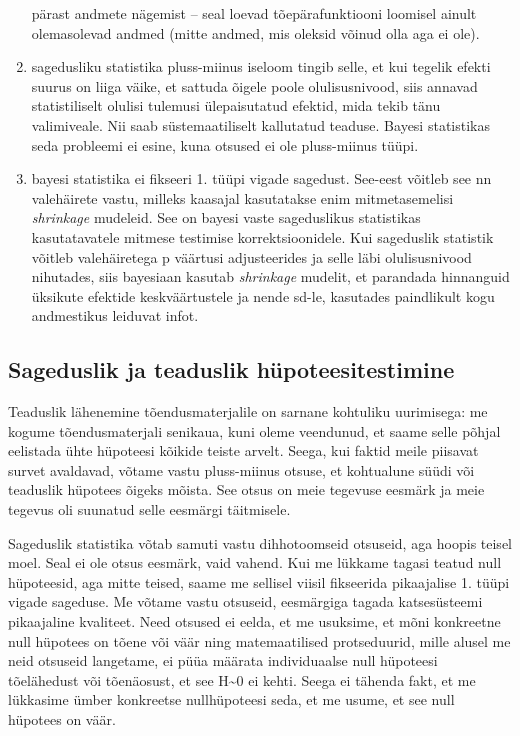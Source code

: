 \documentclass[]{book}
\begin{document}
\begin{enumerate}
  pärast andmete nägemist -- seal loevad tõepärafunktiooni loomisel
  ainult olemasolevad andmed (mitte andmed, mis oleksid võinud olla aga
  ei ole).
\item
  sagedusliku statistika pluss-miinus iseloom tingib selle, et kui
  tegelik efekti suurus on liiga väike, et sattuda õigele poole
  olulisusnivood, siis annavad statistiliselt olulisi tulemusi
  ülepaisutatud efektid, mida tekib tänu valimiveale. Nii saab
  süstemaatiliselt kallutatud teaduse. Bayesi statistikas seda probleemi
  ei esine, kuna otsused ei ole pluss-miinus tüüpi.
\item
  bayesi statistika ei fikseeri 1. tüüpi vigade sagedust. See-eest
  võitleb see nn valehäirete vastu, milleks kaasajal kasutatakse enim
  mitmetasemelisi \emph{shrinkage} mudeleid. See on bayesi vaste
  sageduslikus statistikas kasutatavatele mitmese testimise
  korrektsioonidele. Kui sageduslik statistik võitleb valehäiretega p
  väärtusi adjusteerides ja selle läbi olulisusnivood nihutades, siis
  bayesiaan kasutab \emph{shrinkage} mudelit, et parandada hinnanguid
  üksikute efektide keskväärtustele ja nende sd-le, kasutades
  paindlikult kogu andmestikus leiduvat infot.
\end{enumerate}

\subsection*{Sageduslik ja teaduslik
hüpoteesitestimine}\label{sageduslik-ja-teaduslik-hupoteesitestimine}

Teaduslik lähenemine tõendusmaterjalile on sarnane kohtuliku uurimisega:
me kogume tõendusmaterjali senikaua, kuni oleme veendunud, et saame
selle põhjal eelistada ühte hüpoteesi kõikide teiste arvelt. Seega, kui
faktid meile piisavat survet avaldavad, võtame vastu pluss-miinus
otsuse, et kohtualune süüdi või teaduslik hüpotees õigeks mõista. See
otsus on meie tegevuse eesmärk ja meie tegevus oli suunatud selle
eesmärgi täitmisele.

Sageduslik statistika võtab samuti vastu dihhotoomseid otsuseid, aga
hoopis teisel moel. Seal ei ole otsus eesmärk, vaid vahend. Kui me
lükkame tagasi teatud null hüpoteesid, aga mitte teised, saame me
sellisel viisil fikseerida pikaajalise 1. tüüpi vigade sageduse. Me
võtame vastu otsuseid, eesmärgiga tagada katsesüsteemi pikaajaline
kvaliteet. Need otsused ei eelda, et me usuksime, et mõni konkreetne
null hüpotees on tõene või väär ning matemaatilised protseduurid, mille
alusel me neid otsuseid langetame, ei püüa määrata individuaalse null
hüpoteesi tõelähedust või tõenäosust, et see H\textasciitilde{}0 ei
kehti. Seega ei tähenda fakt, et me lükkasime ümber konkreetse
nullhüpoteesi seda, et me usume, et see null hüpotees on väär.
\end{document}
